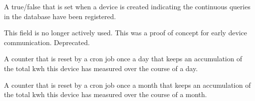 \documentclass[letterpaper,10pt,english]{sphinxmanual}
\begin{document}
\begin{fulllineitems}

\begin{fulllineitems}
\label{modules/microdata:microdata.models.Device.event_set}
\end{fulllineitems}


\begin{fulllineitems}
\label{modules/microdata:microdata.models.Device.fanout_query_registered}
A true/false that is set when a device is created indicating the continuous queries in the database have been registered.

\end{fulllineitems}


\begin{fulllineitems}
\label{modules/microdata:microdata.models.Device.ip_address}
This field is no longer actively used. This was a proof of concept for early device communication. Deprecated.

\end{fulllineitems}


\begin{fulllineitems}
\label{modules/microdata:microdata.models.Device.kilowatt_hours_daily}
A counter that is reset by a cron job once a day that keeps an accumulation of the total kwh this device has measured over the course of a day.

\end{fulllineitems}


\begin{fulllineitems}
\label{modules/microdata:microdata.models.Device.kilowatt_hours_monthly}
A counter that is reset by a cron job once a month that keeps an accumulation of the total kwh this device has measured over the course of a month.


\end{fulllineitems}
\end{fulllineitems}
\end{document}
